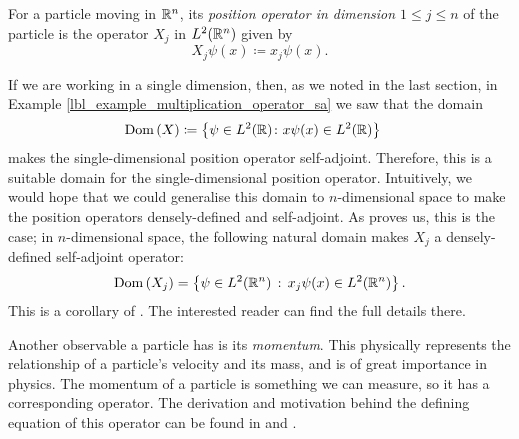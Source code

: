 \begin{definition}\label{lbl_def_position_operator}
  For a particle moving in $\mathbb{R}^n$, its {\emph{position operator in dimension $1 \leq j \leq n$}} of the particle is the operator $X_j$ in $L^2(\mathbb{R}^n)$ given by
  \begin{equation*}
      X_j \psi({x}) \coloneqq x_j \psi({x}).
  \end{equation*}
\end{definition}
\begin{remark}\label{lbl_remark_n_dimensional_position_op_sa}
  If we are working in a single dimension, then, as we noted in the last section, in Example \eqref{lbl_example_multiplication_operator_sa} we saw that the domain
  \begin{align*}
    \operatorname{Dom}\left(X\right) &\coloneqq  \left\{\psi \in L^2(\mathbb{R}) \colon x\psi(x) \in L^2(\mathbb{R})\right\}
  \end{align*}
  makes the single-dimensional position operator self-adjoint. Therefore, this is a suitable domain for the single-dimensional position operator. Intuitively, we would hope that we could generalise this domain to $n$-dimensional space to make the position operators densely-defined and self-adjoint. As {\cite[Corollary 9.31]{Hall2013}} proves us, this is the case; in $n$-dimensional space, the following natural domain makes $X_j$ a densely-defined self-adjoint operator:
  \begin{equation*}
    \operatorname{Dom}\left(X_j\right) = \left\{\psi \in L^2(\mathbb{R}^n) \, : \, x_j \psi({x}) \in L^2(\mathbb{R}^n)\right\}.
  \end{equation*}
  This is a corollary of {\cite[Proposition 9.30]{Hall2013}}. The interested reader can find the full details there.
\end{remark}

Another observable a particle has is its {\emph{momentum}}. This physically represents the relationship of a particle's velocity and its mass, and is of great importance in physics. The momentum of a particle is something we can measure, so it has a corresponding operator. The derivation and motivation behind the defining equation of this operator can be found in {\cite[Chapter 11.2]{kreyszig}} and {\cite[Chapter 3.4]{Hall2013}}.


